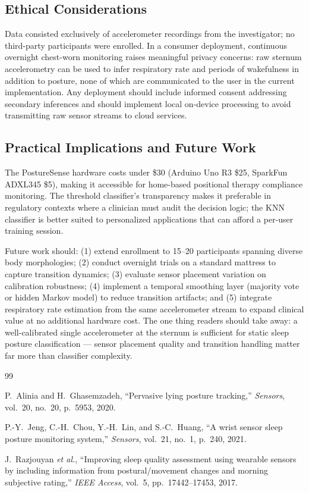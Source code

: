\documentclass[conference]{IEEEtran}
\begin{document}
\subsection{Ethical Considerations}

Data consisted exclusively of accelerometer recordings from the investigator; no
third-party participants were enrolled.
In a consumer deployment, continuous overnight chest-worn monitoring raises meaningful
privacy concerns: raw sternum accelerometry can be used to infer respiratory rate and
periods of wakefulness in addition to posture, none of which are communicated to the
user in the current implementation.
Any deployment should include informed consent addressing secondary inferences and
should implement local on-device processing to avoid transmitting raw sensor streams
to cloud services.

\subsection{Practical Implications and Future Work}

The PostureSense hardware costs under \$30 (Arduino Uno R3 \$25, SparkFun ADXL345
\$5), making it accessible for home-based positional therapy compliance monitoring.
The threshold classifier's transparency makes it preferable in regulatory contexts
where a clinician must audit the decision logic; the KNN classifier is better suited
to personalized applications that can afford a per-user training session.

Future work should: (1) extend enrollment to 15--20 participants spanning diverse body
morphologies; (2) conduct overnight trials on a standard mattress to capture transition
dynamics; (3) evaluate sensor placement variation on calibration robustness;
(4) implement a temporal smoothing layer (majority vote or hidden Markov model) to
reduce transition artifacts; and (5) integrate respiratory rate estimation from the
same accelerometer stream to expand clinical value at no additional hardware cost.
The one thing readers should take away: a well-calibrated single accelerometer at the
sternum is sufficient for static sleep posture classification --- sensor placement
quality and transition handling matter far more than classifier complexity.


\begin{thebibliography}{99}

P.~Alinia and H.~Ghasemzadeh,
``Pervasive lying posture tracking,''
\textit{Sensors}, vol.~20, no.~20, p.~5953, 2020.

P.-Y.~Jeng, C.-H.~Chou, Y.-H.~Lin, and S.-C.~Huang,
``A wrist sensor sleep posture monitoring system,''
\textit{Sensors}, vol.~21, no.~1, p.~240, 2021.

J.~Razjouyan \textit{et al.},
``Improving sleep quality assessment using wearable sensors by including
information from postural/movement changes and morning subjective rating,''
\textit{IEEE Access}, vol.~5, pp.~17442--17453, 2017.

\end{thebibliography}
\end{document}
